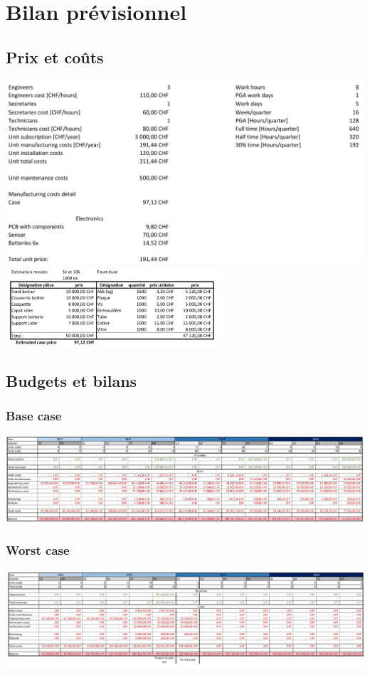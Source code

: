 \documentclass[11pt,titlepage]{report}
\begin{document}
\chapter{Bilan prévisionnel}
\label{app:bilan}
\section{Prix et coûts}
\includegraphics[width=\textwidth]{Images/business/costs.png} \\[1cm]
\includegraphics[width=0.6\textwidth]{Images/business/case_price.PNG}
\newpage
\section{Budgets et bilans}
\subsection{Base case}
\includegraphics[angle=90, height=\textheight]{Images/business/base.png}
\subsection{Worst case}
\includegraphics[angle=90, height=\textheight]{Images/business/worst.png}
\end{document}
